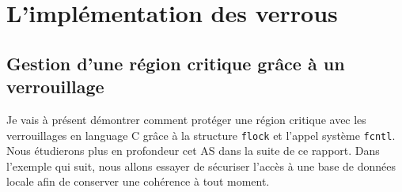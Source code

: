 \newpage
\section{L'implémentation des verrous}

\subsection{Gestion d'une région critique grâce à un verrouillage}
Je vais à présent démontrer comment protéger une région critique avec les verrouillages en language C grâce à la structure \texttt{flock} et l'appel système \texttt{fcntl}. Nous étudierons plus en profondeur cet AS dans la suite de ce rapport.
\newline
Dans l'exemple qui suit, nous allons essayer de sécuriser l'accès à une base de données locale afin de conserver une cohérence à tout moment.

